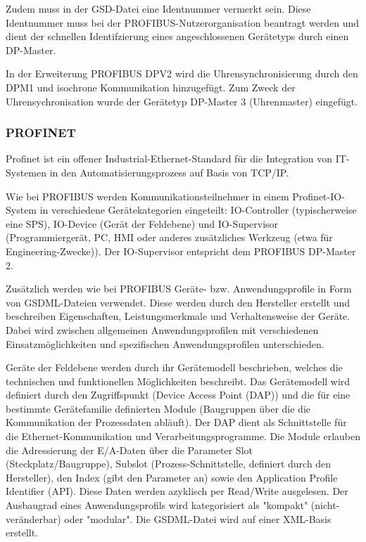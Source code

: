 Zudem muss in der GSD-Datei eine Identnummer vermerkt sein. Diese Identnummer muss bei der PROFIBUS-Nutzerorganisation beantragt werden und dient der schnellen Identifzierung eines angeschlossenen Gerätetyps durch einen DP-Master.

In der Erweiterung PROFIBUS DPV2 wird die Uhrensynchronisierung durch den DPM1 und isochrone Kommunikation hinzugefügt. Zum Zweck der Uhrensychronisation wurde der Gerätetyp DP-Master 3 (Uhrenmaster) eingefügt.


\subsubsection{PROFINET}
Profinet ist ein offener Industrial-Ethernet-Standard für die Integration  von IT-Systemen in den Automatisierungsprozess auf Basis von TCP/IP. 


Wie bei PROFIBUS werden Kommunikationsteilnehmer in einem Profinet-IO-System in verschiedene Gerätekategorien eingeteilt: IO-Controller (typischerweise eine SPS), IO-Device (Gerät der Feldebene) und IO-Supervisor (Programmiergerät, PC, HMI oder anderes zusätzliches Werkzeug (etwa für Engineering-Zwecke)). Der IO-Supervisor entspricht dem PROFIBUS DP-Master 2. 

Zusätzlich werden wie bei PROFIBUS Geräte- bzw. Anwendungsprofile in Form von GSDML-Dateien verwendet. Diese werden durch den Hersteller erstellt und beschreiben Eigenschaften, Leistungsmerkmale und Verhaltensweise der Geräte. Dabei wird zwischen allgemeinen Anwendungsprofilen mit verschiedenen Einsatzmöglichkeiten und spezifischen Anwendungsprofilen unterschieden. 

Geräte der Feldebene werden durch ihr Gerätemodell beschrieben, welches die technischen und funktionellen Möglichkeiten beschreibt. Das Gerätemodell wird definiert durch den Zugriffspunkt (Device Access Point (DAP)) und die für eine bestimmte Gerätefamilie definierten Module (Baugruppen über die die Kommunikation der Prozessdaten abläuft). Der DAP dient als Schnittstelle für die Ethernet-Kommunikation und Verarbeitungsprogramme. Die Module erlauben die Adressierung der E/A-Daten über die Parameter Slot (Steckplatz/Baugruppe), Subslot (Prozess-Schnittstelle, definiert durch den Hersteller), den Index (gibt den Parameter an) sowie den Application Profile Identifier (API). Diese Daten werden azyklisch per Read/Write ausgelesen.
Der Ausbaugrad eines Anwendungsprofils wird kategorisiert als "kompakt" (nicht-veränderbar) oder "modular". Die GSDML-Datei wird auf einer XML-Basis erstellt.


